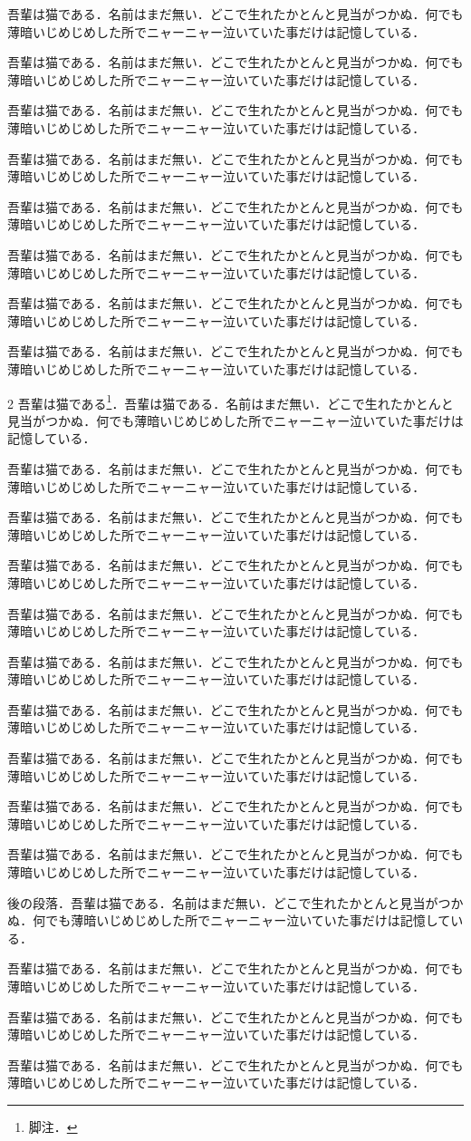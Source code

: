 \documentclass[paper=a4,fontsize=10pt]{jlreq}
\newcommand\para{吾輩は猫である．名前はまだ無い．どこで生れたかとんと見当がつかぬ．何でも薄暗いじめじめした所でニャーニャー泣いていた事だけは記憶している．\par}
\begin{document}
\para\para\para\para\para\para\para\para
\begin{multicols}{2}
吾輩は猫である\footnote{脚注．}．\para \para\para\para\para\para\para\para\para\para
\end{multicols}

後の段落．\para\para\para\para
\end{document}
